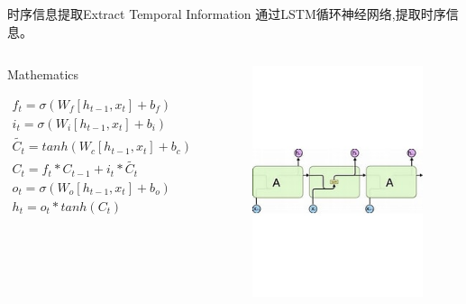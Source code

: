 \documentclass{ctexbeamer}
\begin{document}
\begin{frame}{时序信息提取}{Extract Temporal Information}
    通过LSTM循环神经网络,提取时序信息。
    \begin{columns}
        \begin{center}
        \begin{block}{Mathematics}
        \begin{center}
        \begin{gather*}
            f_t = \sigma (W_f [h_{t-1},x_t] + b_f)\\
            i_t = \sigma (W_i [h_{t-1},x_t] + b_i)\\
            \tilde{C_t} = tanh(W_c [h_{t-1},x_t] + b_c)\\
            C_t = f_t * C_{t-1} + i_t * \tilde{C_t}\\
            o_t = \sigma (W_o [h_{t-1},x_t] + b_o)\\
            h_t = o_t * tanh(C_t)
        \end{gather*} 
        \end{center} 
        \end{block}
        \end{center}
        \begin{figure}
            \centering
            \includegraphics[width=5cm]{lstm}
        \end{figure}
    \end{columns}
\end{frame}
\end{document}
